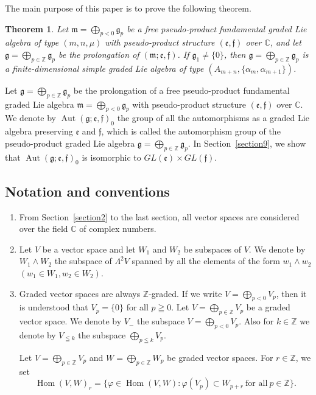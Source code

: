 \documentclass[pdftex]{sigma}
\numberwithin{equation}{section}
\numberwithin{theorem}{section}
\numberwithin{proposition}{section}
\numberwithin{lemma}{section}
\numberwithin{corollary}{section}
\numberwithin{definition}{section}
\numberwithin{example}{section}
\numberwithin{remark}{section}
\numberwithin{note}{section}
\newtheorem{theoremI}{Theorem}[]
\newcommand{\Hom}{\operatorname{Hom}}
\newcommand{\Aut}{\operatorname{Aut}}
\newcommand{\gla}[1]{\mathfrak#1=\bigoplus\limits_{p\in\mathbb Z}\mathfrak#1_p} \renewcommand{\labelenumi}{{\rm (\arabic{enumi})}}
\begin{document}
The main purpose of this paper is to prove the following theorem.

\begin{theoremI}\label{Yatsui-theoremII}
Let $\mathfrak m=\bigoplus\limits_{p<0}\mathfrak g_p$ be a free
pseudo-product fundamental graded Lie algebra of type $(m,n,\mu)$ with
pseudo-product structure $(\mathfrak e,\mathfrak f)$ over $\mathbb C$, and let
$\gla g$
be the prolongation of $(\mathfrak m;\mathfrak e,\mathfrak f)$.
If $\mathfrak g_{1}\ne\{0\}$, then
$\gla g$
is a finite-dimensional simple graded Lie algebra of type
$(A_{m+n},\{\alpha_m,\alpha_{m+1}\})$.
\end{theoremI}

Let $\gla g$ be the prolongation of a free pseudo-product fundamental
graded Lie algebra $\mathfrak m=\bigoplus\limits_{p<0}\mathfrak g_p$ with pseudo-product
structure $(\mathfrak e,\mathfrak f)$ over $\mathbb C$.
We denote by $\Aut(\mathfrak g;\mathfrak e,\mathfrak f)_0$ the group of
all the automorphisms as a graded Lie algebra preserving $\mathfrak e$ and
$\mathfrak f$, which is called the automorphism group of
the pseudo-product graded Lie algebra $\gla g$.
In Section~\ref{section9}, we show that $\Aut(\mathfrak g;\mathfrak e,\mathfrak f)_0$
is isomorphic to
$GL(\mathfrak e)\times GL(\mathfrak f)$.

\subsection*{Notation and conventions}
\begin{enumerate}\itemsep=0pt
\item From Section~\ref{section2} to the last section, all vector spaces are considered over
the f\/ield $\mathbb C$ of complex numbers.
\item
Let $V$ be a vector space and let $W_1$ and $W_2$ be subspaces of $V$.
We denote by $W_1\wedge W_2$ the subspace of $\Lambda^2V$
spanned by all the elements of the form $w_1\wedge w_2$
$(w_1\in W_1,w_2\in W_2)$.
\item Graded vector spaces are always $\mathbb Z$-graded. If we write
$V=\bigoplus\limits_{p<0} V_p$, then
it is understood that $V_p=\{0\}$ for all $p\geqq0$.
Let $V=\bigoplus\limits_{p\in\mathbb Z}V_p$ be a graded vector space.
We denote by $V_-$ the subspace $V=\bigoplus\limits_{p<0} V_p$. Also
for $k\in \mathbb Z$ we denote by
$V_{\leqq k}$ the subspace $\bigoplus\limits_{p\leqq k} V_p$.

Let $V=\bigoplus\limits_{p\in\mathbb Z}V_p$ and
$W=\bigoplus\limits_{p\in\mathbb Z}W_p$ be graded vector spaces.
For $r\in\mathbb Z$, we set
\[
\Hom(V,W)_r=\{\varphi\in\Hom(V,W):\varphi(V_p)\subset W_{p+r}\
\text{for all} \ p\in\mathbb Z\}.
\]
\end{enumerate}
\end{document}
